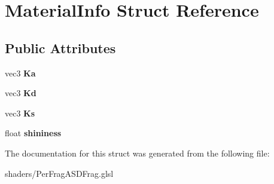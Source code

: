 \hypertarget{structMaterialInfo}{\section{Material\-Info Struct Reference}
\label{structMaterialInfo}
}
\subsection*{Public Attributes}
\begin{DoxyCompactItemize}
\item 
\hypertarget{structMaterialInfo_a173a0695aa198dacbfbab6f904b903f8}{vec3 {\bfseries Ka}}\label{structMaterialInfo_a173a0695aa198dacbfbab6f904b903f8}

\item 
\hypertarget{structMaterialInfo_ac677bc8caf0e1dc4f2f7263a26b5909f}{vec3 {\bfseries Kd}}\label{structMaterialInfo_ac677bc8caf0e1dc4f2f7263a26b5909f}

\item 
\hypertarget{structMaterialInfo_aedd4959744794aff3c1ba75889a26723}{vec3 {\bfseries Ks}}\label{structMaterialInfo_aedd4959744794aff3c1ba75889a26723}

\item 
\hypertarget{structMaterialInfo_afa685a279a7996279d3984038537ac46}{float {\bfseries shininess}}\label{structMaterialInfo_afa685a279a7996279d3984038537ac46}

\end{DoxyCompactItemize}


The documentation for this struct was generated from the following file\-:\begin{DoxyCompactItemize}
\item 
shaders/Per\-Frag\-A\-S\-D\-Frag.\-glsl\end{DoxyCompactItemize}
